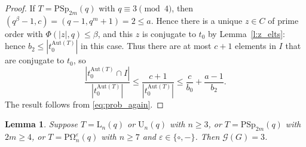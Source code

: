 \documentclass[twoside,a4paper,reqno,11pt]{amsart}
\newcommand{\e}{\varepsilon}
\newcommand{\<}{\langle}
\renewcommand{\>}{\rangle}
\newcommand{\leqs}{\leqslant}
\newcommand{\geqs}{\geqslant}
\def\ge{\geqs}
\def\le{\leqs}
\newcommand{\Aut}{\mathrm{Aut}}
\newcommand{\PSp}{\mathrm{PSp}}
\newcommand{\POmega}{\mathrm{P\Omega}}
\newcommand{\LL}{\mathrm{L}}
\newcommand{\UU}{\mathrm{U}}
\newcommand{\cmrd}{\textcolor{blue}}
\newtheorem{lem}[thm]{Lemma}
\theoremstyle{definition}
\begin{document}
\begin{proof}
If $T = \PSp_{2m}(q)$ with $q\equiv 3\pmod 4$, then $(q^\beta-1,c) = (q-1, q^m+1) = 2 \leqs a$. Hence there is a unique $z\in C$ of prime order with $\Phi(|z|,q) \leqs \beta$, and this $z$ is conjugate to $t_0$ by Lemma~\ref{l:z_elts}: hence $b_2 \le |t_0^{\Aut(T)}|$ in this case.
Thus there are at most $c+1$ elements in $I$ that are conjugate to $t_0$, so 
\begin{equation*}
\frac{|t_0^{\Aut(T)}\cap I|}{|t_0^{\Aut(T)}|} \leqs \frac{c+1}{|t_0^{\Aut(T)}|} \leqs \frac{c}{b_0} + \frac{a-1}{b_2}.
\end{equation*}
The result follows from \eqref{eq:prob_again}.
%
%
%
\end{proof}

\begin{lem}
	\label{l:luso}
	Suppose $T = \LL_n(q)$ or $\UU_n(q)$ with $n\geqs 3$, or $T = \PSp_{2m}(q)$ with $2m \ge 4$, or $T = \POmega^\e_{n}(q)$ with $n\ge 7$ and $\e \in \{\circ, -\}$. Then $\mathcal{G}(G) = 3$.
\end{lem}
\end{document}
